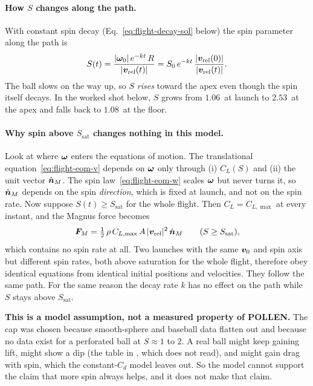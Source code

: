 \paragraph{How $S$ changes along the path.}
With constant spin decay (Eq.~\eqref{eq:flight-decay-sol} below) the spin parameter along the path is
\begin{equation}
  S(t) = \frac{|\bm{\omega}_0|\,e^{-kt}\,R}{|\bm{v}_{\mathrm{rel}}(t)|}
       = S_0\,e^{-kt}\,\frac{|\bm{v}_{\mathrm{rel}}(0)|}{|\bm{v}_{\mathrm{rel}}(t)|}.
  \label{eq:flight-S-t}
\end{equation}
The ball slows on the way up, so $S$ \emph{rises} toward the apex even though the spin itself decays.
In the worked shot below, $S$ grows from $1.06$\assumed\ at launch to $2.53$\predicted\ at the apex and
falls back to $1.08$\predicted\ at the floor.

\paragraph{Why spin above $S_{\mathrm{sat}}$ changes nothing in this model.}
Look at where $\bm{\omega}$ enters the equations of motion.
The translational equation~\eqref{eq:flight-eom-v} depends on $\bm{\omega}$ only through
(i) $C_L(S)$ and (ii) the unit vector $\hat{\bm{n}}_M$.
The spin law~\eqref{eq:flight-eom-w} scales $\bm{\omega}$ but never turns it, so $\hat{\bm{n}}_M$
depends on the spin \emph{direction}, which is fixed at launch, and not on the spin rate.
Now suppose $S(t) \ge S_{\mathrm{sat}}$ for the whole flight.
Then $C_L = C_{L,\max}$ at every instant, and the Magnus force becomes
\begin{equation}
  \bm{F}_M = \tfrac12\,\rho\,C_{L,\max}\,A\,|\bm{v}_{\mathrm{rel}}|^2\,\hat{\bm{n}}_M
  \qquad (S \ge S_{\mathrm{sat}}),
  \label{eq:flight-FM-sat}
\end{equation}
which contains no spin rate at all.
Two launches with the same $\bm{v}_0$ and spin axis but different spin rates, both above
saturation for the whole flight, therefore obey identical equations from identical initial
positions and velocities.
They follow the same path.
For the same reason the decay rate $k$ has no effect on the path while $S$ stays above $S_{\mathrm{sat}}$.

\textbf{This is a model assumption, not a measured property of POLLEN.}
The cap was chosen because smooth-sphere and baseball data flatten out and because no data exist for a
perforated ball at $S \approx 1$ to $2$.
A real ball might keep gaining lift, might show a dip (the  table in
, which  does not read), and might gain drag with spin,
which the constant-$C_d$ model leaves out.
So the model cannot support the claim that more spin always helps, and it does not make that claim.

